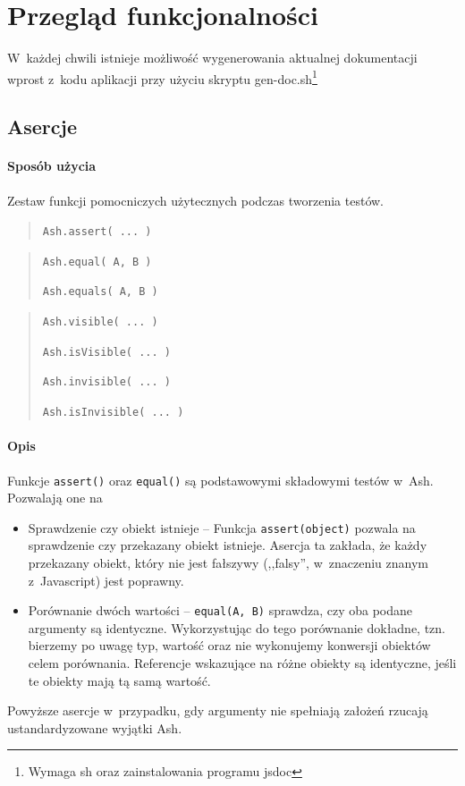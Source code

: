 \documentclass[brudnopis]{xmgr}
\begin{document}
\chapter{Przegląd funkcjonalności}

W~każdej chwili istnieje możliwość wygenerowania aktualnej dokumentacji wprost z~kodu aplikacji przy użyciu skryptu gen-doc.sh\footnote{Wymaga sh oraz zainstalowania programu jsdoc}

\section{Asercje}

\subsubsection{Sposób użycia}

Zestaw funkcji pomocniczych użytecznych podczas tworzenia testów.

\begin{quote}
  \texttt{Ash.assert( ... )} 
\end{quote}

\begin{quote}
  \texttt{Ash.equal( A, B )}

  \texttt{Ash.equals( A, B )} 
\end{quote}

\begin{quote}
  \texttt{Ash.visible( ... )} 

  \texttt{Ash.isVisible( ... )}

  \texttt{Ash.invisible( ... )}

  \texttt{Ash.isInvisible( ... )}
\end{quote}

\subsubsection{Opis}

Funkcje \texttt{assert()} oraz \texttt{equal()} są podstawowymi składowymi testów w~Ash. Pozwalają one na 

\begin{itemize}
  \item Sprawdzenie czy obiekt istnieje -- Funkcja \texttt{assert(object)} pozwala na sprawdzenie czy przekazany obiekt istnieje. Asercja ta zakłada, że każdy przekazany obiekt, który nie jest fałszywy (,,falsy'', w~znaczeniu znanym z~Javascript) jest poprawny. 
  \item Porównanie dwóch wartości -- \texttt{equal(A, B)} sprawdza, czy oba podane argumenty są identyczne. Wykorzystując do tego porównanie dokładne, tzn. bierzemy po uwagę typ, wartość oraz nie wykonujemy konwersji obiektów celem porównania. Referencje wskazujące na różne obiekty są identyczne, jeśli te obiekty mają tą samą wartość.
\end{itemize}
Powyższe asercje w~przypadku, gdy argumenty nie spełniają założeń rzucają ustandardyzowane wyjątki Ash. 
\end{document}
